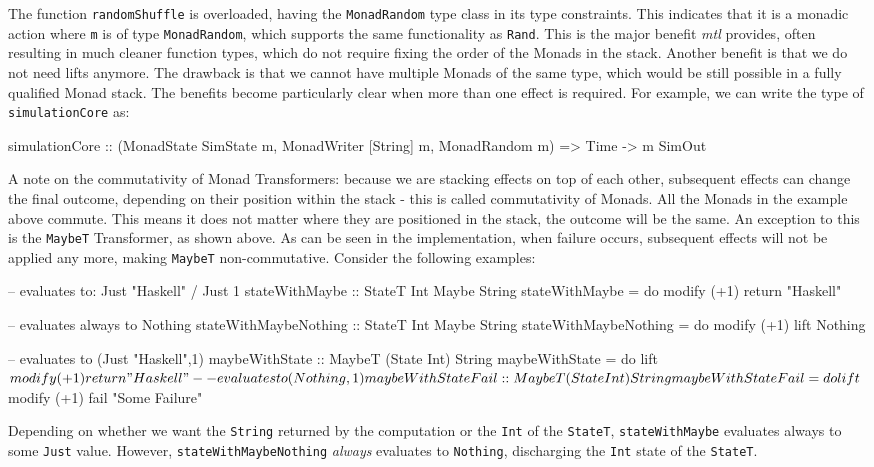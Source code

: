 The function \texttt{randomShuffle} is overloaded, having the \texttt{MonadRandom} type class in its type constraints. This indicates that it is a monadic action where \texttt{m} is of type \texttt{MonadRandom}, which supports the same functionality as \texttt{Rand}. This is the major benefit \textit{mtl} provides, often resulting in much cleaner function types, which do not require fixing the order of the Monads in the stack. Another benefit is that we do not need lifts anymore. The drawback is that we cannot have multiple Monads of the same type, which would be still possible in a fully qualified Monad stack. The benefits become particularly clear when more than one effect is required. For example, we can write the type of \texttt{simulationCore} as:

\begin{HaskellCode}
simulationCore :: (MonadState SimState m, MonadWriter [String] m, MonadRandom m) 
               => Time -> m SimOut
\end{HaskellCode}

A note on the commutativity of Monad Transformers: because we are stacking effects on top of each other, subsequent effects can change the final outcome, depending on their position within the stack - this is called commutativity of Monads. All the Monads in the example above commute. This means it does not matter where they are positioned in the stack, the outcome will be the same. An exception to this is the \texttt{MaybeT} Transformer, as shown above. As can be seen in the implementation, when failure occurs, subsequent effects will not be applied any more, making \texttt{MaybeT} non-commutative. Consider the following examples:

\begin{HaskellCode}
-- evaluates to: Just "Haskell" / Just 1
stateWithMaybe :: StateT Int Maybe String
stateWithMaybe = do
  modify (+1)
  return "Haskell"

-- evaluates always to Nothing
stateWithMaybeNothing :: StateT Int Maybe String
stateWithMaybeNothing = do
  modify (+1)
  lift Nothing

-- evaluates to (Just "Haskell",1)
maybeWithState :: MaybeT (State Int) String
maybeWithState = do
  lift $ modify (+1)
  return "Haskell"

-- evaluates to (Nothing,1)
maybeWithStateFail :: MaybeT (State Int) String
maybeWithStateFail = do
  lift $ modify (+1)
  fail "Some Failure"
\end{HaskellCode}

Depending on whether we want the \texttt{String} returned by the computation or the \texttt{Int} of the \texttt{StateT}, \texttt{stateWithMaybe} evaluates always to some \texttt{Just} value. However, \texttt{stateWithMaybeNothing} \textit{always} evaluates to \texttt{Nothing}, discharging the \texttt{Int} state of the \texttt{StateT}.

